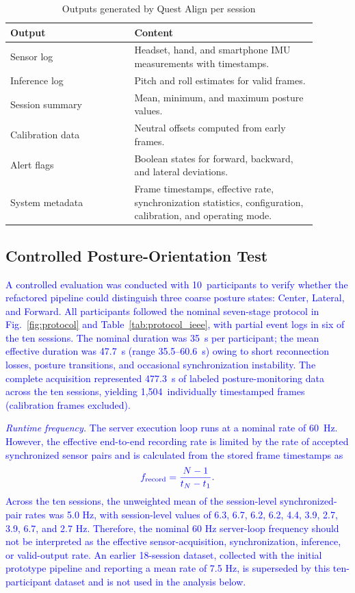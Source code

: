 \documentclass[conference]{IEEEtran}
\newcommand{\CC}[1]{\textcolor{blue}{#1}}
\begin{document}
\begin{table}[t]
\caption{Outputs generated by Quest Align per session}
\label{tab:outputs}
\centering
\renewcommand{\arraystretch}{1.15}
\begin{tabular}{p{0.36\linewidth}p{0.53\linewidth}}
\toprule
Output & Content \\
\midrule
Sensor log        & Headset, hand, and smartphone IMU measurements with timestamps. \\
Inference log     & Pitch and roll estimates for valid frames. \\
Session summary   & Mean, minimum, and maximum posture values. \\
Calibration data  & Neutral offsets computed from early frames. \\
Alert flags       & Boolean states for forward, backward, and lateral deviations. \\
System metadata & Frame timestamps, effective rate, synchronization statistics,
configuration, calibration, and operating mode. \\
\bottomrule
\end{tabular}
\end{table}

\subsection{Controlled Posture-Orientation Test}
\CC{A controlled evaluation was conducted with 10~participants to verify whether the
refactored pipeline could distinguish three coarse posture states: Center, Lateral, and
Forward. All participants followed the nominal seven-stage protocol in Fig.~\ref{fig:protocol} and
Table~\ref{tab:protocol_ieee}, with partial event logs in six of the ten sessions. The nominal duration was 35~s per participant; the mean
effective duration was 47.7~s (range 35.5--60.6~s) owing to short reconnection losses,
posture transitions, and occasional synchronization instability. The complete acquisition
represented 477.3~s of labeled posture-monitoring data across the ten sessions, yielding
1{,}504~individually timestamped frames (calibration frames excluded).}

\CC{\textit{Runtime frequency.} The server execution loop runs at a nominal rate of
60~Hz. However, the effective end-to-end recording rate is limited by the rate of accepted
synchronized sensor pairs and is calculated from the stored frame timestamps as}
\begin{equation}
\CC{f_{\mathrm{record}}=\frac{N-1}{t_N-t_1}.}
\end{equation}
\CC{Across the ten sessions, the unweighted mean of the session-level synchronized-pair rates was 5.0 Hz, with session-level values of 6.3, 6.7, 6.2, 6.2, 4.4, 3.9, 2.7, 3.9, 6.7, and 2.7 Hz. Therefore, the nominal 60 Hz server-loop frequency should not be interpreted as the effective sensor-acquisition, synchronization, inference, or valid-output rate. An earlier 18-session dataset, collected with the initial prototype pipeline and reporting a mean rate of 7.5 Hz, is superseded by this ten-participant dataset and is not used in the analysis below.}
\end{document}
